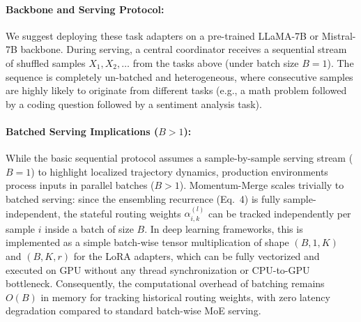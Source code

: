 \documentclass{article}
\theoremstyle{plain}
\theoremstyle{definition}
\theoremstyle{remark}
\begin{document}
\paragraph{Backbone and Serving Protocol:} We suggest deploying these task adapters on a pre-trained LLaMA-7B or Mistral-7B backbone. During serving, a central coordinator receives a sequential stream of shuffled samples $X_1, X_2, \dots$ from the tasks above (under batch size $B=1$). The sequence is completely un-batched and heterogeneous, where consecutive samples are highly likely to originate from different tasks (e.g., a math problem followed by a coding question followed by a sentiment analysis task).

\paragraph{Batched Serving Implications ($B > 1$):} While the basic sequential protocol assumes a sample-by-sample serving stream ($B=1$) to highlight localized trajectory dynamics, production environments process inputs in parallel batches ($B > 1$). Momentum-Merge scales trivially to batched serving: since the ensembling recurrence (Eq.~4) is fully sample-independent, the stateful routing weights $\alpha_{i, k}^{(l)}$ can be tracked independently per sample $i$ inside a batch of size $B$. In deep learning frameworks, this is implemented as a simple batch-wise tensor multiplication of shape $(B, 1, K)$ and $(B, K, r)$ for the LoRA adapters, which can be fully vectorized and executed on GPU without any thread synchronization or CPU-to-GPU bottleneck. Consequently, the computational overhead of batching remains $O(B)$ in memory for tracking historical routing weights, with zero latency degradation compared to standard batch-wise MoE serving.
\end{document}
